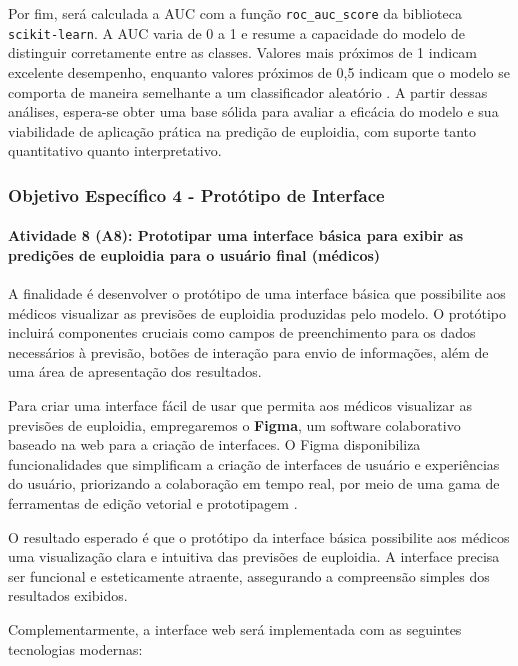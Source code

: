 Por fim, será calculada a AUC com a função \texttt{roc\_auc\_score} da biblioteca \texttt{scikit-learn}. A AUC varia de 0 a 1 e resume a capacidade do modelo de distinguir corretamente entre as classes. Valores mais próximos de 1 indicam excelente desempenho, enquanto valores próximos de 0{,}5 indicam que o modelo se comporta de maneira semelhante a um classificador aleatório \cite{vilela2022}. A partir dessas análises, espera-se obter uma base sólida para avaliar a eficácia do modelo e sua viabilidade de aplicação prática na predição de euploidia, com suporte tanto quantitativo quanto interpretativo.

\subsubsection{\textbf{Objetivo Específico 4} - Protótipo de Interface}

\paragraph{\textbf{Atividade 8 (A8):} Prototipar uma interface básica para exibir as predições de euploidia para o usuário final (médicos)}

A finalidade é desenvolver o protótipo de uma interface básica que possibilite aos médicos visualizar as previsões de euploidia produzidas pelo modelo. O protótipo incluirá componentes cruciais como campos de preenchimento para os dados necessários à previsão, botões de interação para envio de informações, além de uma área de apresentação dos resultados.

Para criar uma interface fácil de usar que permita aos médicos visualizar as previsões de euploidia, empregaremos o  \textbf{Figma}, um software colaborativo baseado na web para a criação de interfaces. O Figma disponibiliza funcionalidades que simplificam a criação de interfaces de usuário e experiências do usuário, priorizando a colaboração em tempo real, por meio de uma gama de ferramentas de edição vetorial e prototipagem \cite{figma2024}.

O resultado esperado é que o protótipo da interface básica possibilite aos médicos uma visualização clara e intuitiva das previsões de euploidia. A interface precisa ser funcional e esteticamente atraente, assegurando a compreensão simples dos resultados exibidos.

Complementarmente, a interface web será implementada com as seguintes tecnologias modernas:

